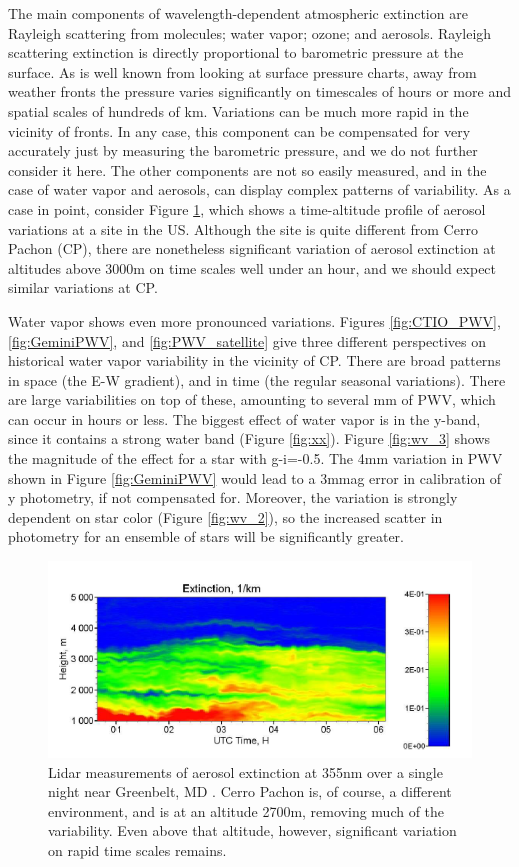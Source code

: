 \documentclass[12pt,preprint]{aastex}
\begin{document}
The main components of wavelength-dependent atmospheric extinction are Rayleigh scattering from molecules; water vapor; ozone; and aerosols.   Rayleigh scattering extinction is directly proportional to barometric pressure at the surface.  As is well known from looking at surface pressure charts, away from weather fronts the pressure varies significantly on timescales of hours or more and spatial scales of hundreds of km.  Variations can be much more rapid in the vicinity of fronts.   In any case, this component can be compensated for very accurately just by measuring the barometric pressure, and we do not further consider it here.  The other components are not so easily measured, and in the case of water vapor and aerosols, can display complex patterns of variability.   As a case in point, consider Figure \ref{fig:AerosolVar}, which shows a time-altitude profile of aerosol variations at a site in the US.  Although the site is quite different from Cerro Pachon (CP), there are nonetheless significant variation of aerosol extinction at altitudes above 3000m on time scales well under an hour, and we should expect similar variations at CP.  

Water vapor shows even more pronounced variations.  Figures \ref{fig:CTIO_PWV}, \ref{fig:GeminiPWV}, and \ref{fig:PWV_satellite} give three different perspectives on historical water vapor variability in the vicinity of CP.  There are broad patterns in space (the E-W gradient), and in time (the regular seasonal variations).  There are large variabilities on top of these, amounting to several mm of PWV, which can occur in hours or less.   The biggest effect of water vapor is in the y-band, since it contains a strong water band (Figure \ref{fig:xx}).   Figure \ref{fig:wv_3} shows the magnitude of the effect for a star with g-i=-0.5.  The 4mm variation in PWV shown in Figure \ref{fig:GeminiPWV} would lead to a 3mmag error in calibration of y photometry, if not compensated for.  Moreover, the variation is strongly dependent on star color (Figure \ref{fig:wv_2}), so the increased scatter in photometry for an ensemble of stars will be significantly greater.

\begin{figure}[htbp]
\includegraphics[width=6in]{AtmoFigs/AerosolVar}
\caption{ {Lidar measurements of aerosol extinction at 355nm over a single night
near Greenbelt, MD \citep{Veselovskii2013}.  Cerro Pachon is, of
course, a different environment, and is at an altitude 2700m, removing
much of the variability.  Even above that altitude, however,
significant variation on rapid time scales remains.}
\label{fig:AerosolVar} }
\end{figure}
\end{document}
